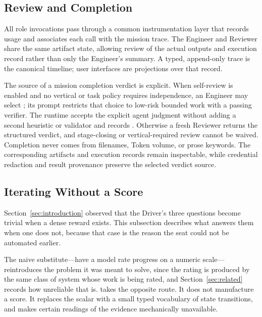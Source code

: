 \subsection{Review and Completion}

All role invocations pass through a common instrumentation layer that records usage
and associates each call with the mission trace. The Engineer and Reviewer share
the same artifact state, allowing review of the actual outputs and execution record
rather than only the Engineer's summary. A typed, append-only trace is the canonical
timeline; user interfaces are projections over that record.

The source of a mission completion verdict is explicit. When self-review is enabled
and no vertical or task policy requires independence, an Engineer may select
; its prompt restricts that choice to low-risk bounded work with
a passing verifier. The runtime accepts the explicit agent judgment without adding
a second heuristic or validator and records
. Otherwise a fresh Reviewer
returns the structured verdict, and stage-closing or vertical-required review cannot
be waived. Completion never comes from filenames, Token volume, or prose keywords.
The corresponding artifacts and execution records remain inspectable, while
credential redaction and result provenance preserve the selected verdict source.

\subsection{Iterating Without a Score}
\label{sec:no-score}

Section~\ref{sec:introduction} observed that the Driver's three questions become
trivial when a dense reward exists. This subsection describes what answers them when
one does not, because that case is the reason the seat could not be automated
earlier.

The naive substitute---have a model rate progress on a numeric scale---reintroduces
the problem it was meant to solve, since the rating is produced by the same class of
system whose work is being rated, and Section~\ref{sec:related} records how
unreliable that is. \systemname{} takes the opposite route. It does not manufacture a
score. It replaces the scalar with a small typed vocabulary of state transitions, and
makes certain readings of the evidence mechanically unavailable.

